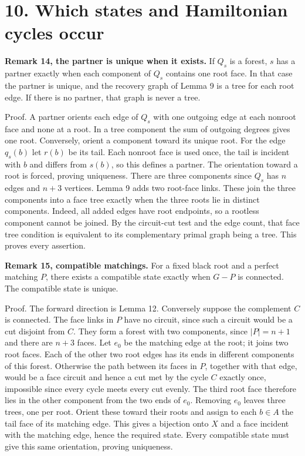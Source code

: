 \documentclass[a4paper,11pt]{amsart}
\begin{document}
\section*{10. Which states and Hamiltonian cycles occur}

\textbf{Remark 14, the partner is unique when it exists.} If $Q_s$ is a forest, $s$ has a partner exactly when each component of $Q_s$ contains one root face. In that case the partner is unique, and the recovery graph of Lemma 9 is a tree for each root edge. If there is no partner, that graph is never a tree.

Proof. A partner orients each edge of $Q_s$ with one outgoing edge at each nonroot face and none at a root. In a tree component the sum of outgoing degrees gives one root. Conversely, orient a component toward its unique root. For the edge $q_s(b)$ let $r(b)$ be its tail. Each nonroot face is used once, the tail is incident with $b$ and differs from $s(b)$, so this defines a partner. The orientation toward a root is forced, proving uniqueness. There are three components since $Q_s$ has $n$ edges and $n+3$ vertices. Lemma 9 adds two root-face links. These join the three components into a face tree exactly when the three roots lie in distinct components. Indeed, all added edges have root endpoints, so a rootless component cannot be joined. By the circuit-cut test and the edge count, that face tree condition is equivalent to its complementary primal graph being a tree. This proves every assertion.

\textbf{Remark 15, compatible matchings.} For a fixed black root and a perfect matching $P$, there exists a compatible state exactly when $G-P$ is connected. The compatible state is unique.

Proof. The forward direction is Lemma 12. Conversely suppose the complement $C$ is connected. The face links in $P$ have no circuit, since such a circuit would be a cut disjoint from $C$. They form a forest with two components, since $|P|=n+1$ and there are $n+3$ faces. Let $e_0$ be the matching edge at the root; it joins two root faces. Each of the other two root edges has its ends in different components of this forest. Otherwise the path between its faces in $P$, together with that edge, would be a face circuit and hence a cut met by the cycle $C$ exactly once, impossible since every cycle meets every cut evenly. The third root face therefore lies in the other component from the two ends of $e_0$. Removing $e_0$ leaves three trees, one per root. Orient these toward their roots and assign to each $b\in A$ the tail face of its matching edge. This gives a bijection onto $X$ and a face incident with the matching edge, hence the required state. Every compatible state must give this same orientation, proving uniqueness.
\end{document}
